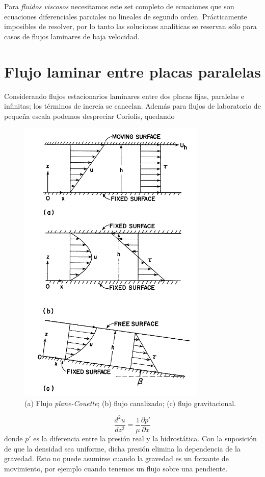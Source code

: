 \documentclass[openany]{book}
\begin{document}
\par Para \emph{fluidos viscosos} necesitamos este set completo de 
ecuaciones que son ecuaciones diferenciales parciales no lineales de 
segundo orden. Prácticamente imposibles de resolver, por lo tanto las 
soluciones analíticas se reservan sólo para casos de flujos laminares 
de baja velocidad.

\section{Flujo laminar entre placas paralelas}
Considerando flujos estacionarios laminares entre dos placas
fijas, paralelas e infinitas; los términos de inercia se cancelan. Además 
para flujos de laboratorio de pequeña escala podemos despreciar
Coriolis, quedando

\begin{figure}[htb]
    \centering
    \includegraphics[width=0.6\linewidth]{img/laminar-fluxes.png}
    \caption{(a) Flujo \emph{plane-Couette}; (b) flujo canalizado;
    (c) flujo gravitacional.}
    \label{fig:laminar-flows}
\end{figure}


\begin{equation}
    \frac{d^2u}{dz^2}=\frac{1}{\mu}\frac{\partial p'}{\partial x}
\end{equation}
donde $p'$ es la diferencia entre la presión real y la
hidrostática. Con la suposición de que la densidad sea uniforme,
dicha presión elimina la dependencia de la gravedad. Esto no
puede asumirse cuando la gravedad es un forzante de movimiento,
por ejemplo cuando tenemos un flujo sobre una pendiente.
\end{document}
